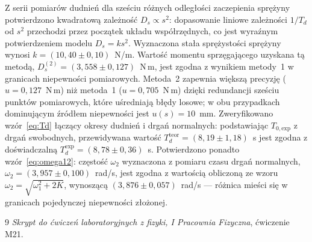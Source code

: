 \documentclass[12pt, a4paper]{article}
\begin{document}
Z serii pomiarów dudnień dla sześciu różnych odległości zaczepienia sprężyny
potwierdzono kwadratową zależność $D_s \propto s^2$: dopasowanie liniowe
zależności $1/T_d$ od $s^2$ przechodzi przez początek układu współrzędnych,
co jest wyraźnym potwierdzeniem modelu $D_s = ks^2$.
Wyznaczona stała sprężystości sprężyny wynosi $k = (10{,}40\pm0{,}10)$~N/m.
Wartość momentu sprzęgającego uzyskana tą metodą,
$D_s^{(2)} = (3{,}558\pm0{,}127)$~N\,m, jest zgodna z wynikiem metody~1
w granicach niepewności pomiarowych.
Metoda~2 zapewnia większą precyzję ($u = 0{,}127$~N\,m) niż metoda~1
($u = 0{,}705$~N\,m) dzięki redundancji sześciu punktów pomiarowych,
które uśredniają błędy losowe; w obu przypadkach dominującym źródłem
niepewności jest $u(s) = 10$~mm.
Zweryfikowano wzór~\eqref{eq:Td} łączący okresy dudnień i drgań normalnych:
podstawiając $T_{0,\text{exp}}$ z drgań swobodnych, przewidywana wartość
$T_d^\text{teor} = (8{,}19\pm1{,}18)$~s jest zgodna z doświadczalną
$T_d^\text{exp} = (8{,}78\pm0{,}36)$~s.
Potwierdzono ponadto wzór~\eqref{eq:omega12}: częstość $\omega_2$ wyznaczona
z pomiaru czasu drgań normalnych, $\omega_2 = (3{,}957\pm0{,}100)$~rad/s,
jest zgodna z wartością obliczoną ze wzoru $\omega_2 = \sqrt{\omega_1^2 + 2K}$,
wynoszącą $(3{,}876\pm0{,}057)$~rad/s --- różnica mieści się w granicach
pojedynczej niepewności złożonej.

\begin{thebibliography}{9}
\textit{Skrypt do ćwiczeń laboratoryjnych z fizyki, I Pracownia Fizyczna}, ćwiczenie M21.
\end{thebibliography}
\end{document}
